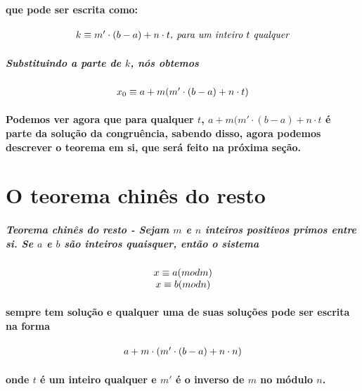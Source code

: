 \paragraph{
que pode ser escrita como:
}
\[	
	\begin{array}{c}
		\textit{$ k \equiv m'\cdot(b-a)+n \cdot t$, para um inteiro $t$ qualquer}\\
	\end{array}
\]
\subparagraph{
Substituindo a parte de $k$, n\'os obtemos
}
\[	
	\begin{array}{c}
		\textit{$ x_0 \equiv a + m (m'\cdot(b-a)+n \cdot t) $}\\
	\end{array}
\]
\paragraph{
Podemos ver agora que para qualquer $t$, $a + m (m'\cdot(b-a)+n \cdot t$ \'e parte da solu\c{c}\~ao da congru\^encia, sabendo disso, agora podemos descrever o teorema em si, que ser\'a feito na pr\'oxima se\c{c}\~ao.
}

\section{O teorema chin\^es do resto}
\subparagraph{
\textit{Teorema chin\^es do resto} - Sejam $m$ e $n$ inteiros positivos primos entre si. Se $a$ e $b$ s\~ao inteiros quaisquer, ent\~ao o sistema
}
\[	
	\begin{array}{c}
		\textit{$ x \equiv a (mod m) $}\\
		\textit{$ x \equiv b (mod n) $}
	\end{array}
\]
\paragraph{
sempre tem solu\c{c}\~ao e qualquer uma de suas solu\c{c}\~oes pode ser escrita na forma
}
\[	
	\begin{array}{c}
		\textit{$ a + m \cdot(m' \cdot (b-a) + n \cdot n) $}\\
	\end{array}
\]
\paragraph{
onde $t$ \'e um inteiro qualquer e $m'$ \'e o inverso de $m$ no m\'odulo $n$.
}